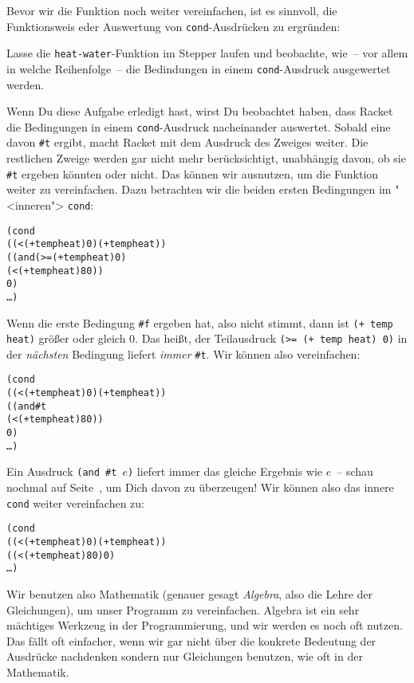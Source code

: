 Bevor wir die Funktion noch weiter vereinfachen, ist es sinnvoll, die
Funktionsweis eder Auswertung von \texttt{cond}-Ausdrücken zu ergründen:
%
\begin{aufgabe}
  Lasse die \texttt{heat-water}-Funktion im Stepper laufen und
  beobachte, wie~-- vor allem in welche Reihenfolge~-- die Bedindungen
  in einem \texttt{cond}-Ausdruck ausgewertet werden.
\end{aufgabe}
%
Wenn Du diese Aufgabe erledigt hast, wirst Du beobachtet haben, dass Racket
die Bedingungen in einem \texttt{cond}-Ausdruck nacheinander
auswertet.  Sobald eine davon \verb|#t| ergibt, macht Racket mit dem
Ausdruck des Zweiges weiter.  Die restlichen Zweige werden gar nicht
mehr berücksichtigt, unabhängig davon, ob sie \verb|#t| ergeben
könnten oder nicht.
Das können wir ausnutzen, um die Funktion weiter zu vereinfachen.
Dazu betrachten wir die beiden ersten Bedingungen im "<inneren">
\texttt{cond}:
%
\begin{alltt}
       (cond
         ((< (+ temp heat) 0) (+ temp heat))
         ((and (>= (+ temp heat) 0)
               (< (+ temp heat) 80))
          0)
         \ldots)
\end{alltt}
%
Wenn die erste Bedingung \verb|#f| ergeben hat, also nicht stimmt,
dann ist \texttt{(+ temp heat)} größer oder gleich 0.  Das heißt, der
Teilausdruck \texttt{(>= (+ temp heat) 0)} in der \emph{nächsten}
Bedingung liefert \emph{immer} \verb|#t|.  Wir können also
vereinfachen:
%
\begin{alltt}
       (cond
         ((< (+ temp heat) 0) (+ temp heat))
         ((and #t
               (< (+ temp heat) 80))
          0)
         \ldots)
\end{alltt}
%
Ein Ausdruck \texttt{(and \#t \(e\))} liefert immer das gleiche Ergebnis
wie \(e\)~-- schau nochmal auf Seite~\pageref{page:and}, um Dich davon
zu überzeugen!  Wir können also das innere \texttt{cond} weiter
vereinfachen zu:
%
\begin{alltt}
       (cond
         ((< (+ temp heat) 0) (+ temp heat))
         ((< (+ temp heat) 80) 0)
         \ldots)
\end{alltt}
%
Wir benutzen also Mathematik (genauer gesagt
\textit{Algebra}, also die Lehre der Gleichungen), um
unser Programm zu vereinfachen.  Algebra ist ein sehr mächtiges
Werkzeug in der Programmierung, und wir werden es noch oft nutzen.
Das fällt oft einfacher, wenn wir gar nicht über die konkrete
Bedeutung der Ausdrücke nachdenken sondern nur Gleichungen benutzen,
wie oft in der Mathematik.

